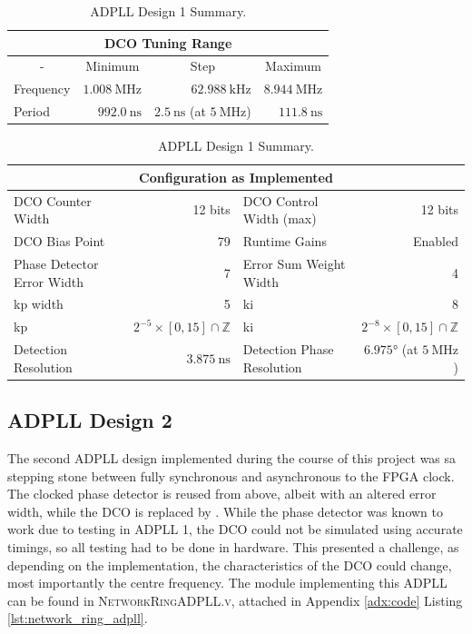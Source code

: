 \begin{table}[!h]
    \begin{center}
        \begin{tabular}{|l|r|r|r|}
            \multicolumn{4}{c}{\ac{DCO} Tuning Range} \T\\
            \hline
            \multicolumn{1}{|c|}{-} & \multicolumn{1}{c|}{Minimum} & \multicolumn{1}{c|}{Step} & \multicolumn{1}{c|}{Maximum} \T\\
            \hline
            Frequency & $1.008~\si{\mega\hertz}$ & \multicolumn{1}{r|}{$62.988~\si{\kilo\hertz}$} & $8.944~\si{\mega\hertz}$ \T\\
            \hline
            Period & $992.0~\si{\nano\second}$ & \multicolumn{1}{r|}{$2.5~\si{\nano\second}$ (at $5~\si{\mega\hertz}$)} & $111.8~\si{\nano\second}$ \T\\
            \hline
        \end{tabular}
        \begin{tabular}{|l|r|l|r|}
            \multicolumn{4}{c}{Configuration as Implemented} \T\\
            \hline
            \ac{DCO} Counter Width & 12 bits & \ac{DCO} Control Width (max) & 12 bits \T\\
            \hline
            \ac{DCO} Bias Point & 79 & Runtime Gains & Enabled \T\\
            \hline
            Phase Detector Error Width & 7 & Error Sum Weight Width & 4 \T\\
            \hline
            \acs{kp} width & 5 & \acs{ki} & 8 \T\\
            \hline
            \acs{kp} & $2^{-5}\times[0,15]\cap\mathbb{Z}$ & \acs{ki} & $2^{-8}\times[0,15]\cap\mathbb{Z}$ \T\\
            \hline
            Detection Resolution & $3.875~\si{\nano\second}$ & Detection Phase Resolution & $6.975\si{\degree}$ (at $5~\si{\mega\hertz}$)\\
            \hline
        \end{tabular}
    \end{center}
\caption[ADPLL Design 1 Summary]{ADPLL Design 1 Summary.}
\label{table:adpll1}
\end{table}

\subsection{\acs{ADPLL} Design 2}
The second \ac{ADPLL} design implemented during the course of this project was sa stepping stone between fully synchronous and asynchronous to the \ac{FPGA} clock. The clocked phase detector is reused from above, albeit with an altered error width, while the \ac{DCO} is replaced by . While the phase detector was known to work due to testing in \ac{ADPLL} 1, the \ac{DCO} could not be simulated using accurate timings, so all testing had to be done in hardware. This presented a challenge, as depending on the implementation, the characteristics of the \ac{DCO} could change, most importantly the centre frequency. The module implementing this \ac{ADPLL} can be found in \textsc{NetworkRingADPLL.v}, attached in Appendix \ref{adx:code} Listing \ref{lst:network_ring_adpll}.

